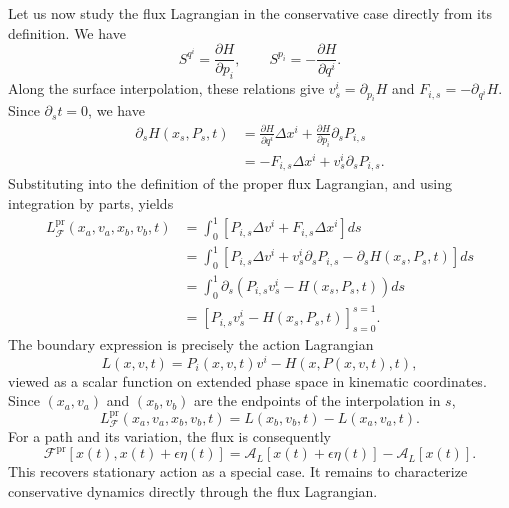 \documentclass[nofootinbib,aps,pre]{revtex4-2}
\begin{document}
Let us now study the flux Lagrangian in the conservative case directly from its definition. We have
\begin{equation}
	S^{q^i}=\frac{\partial H}{\partial p_i},
	\qquad
	S^{p_i}=-\frac{\partial H}{\partial q^i}.
\end{equation}
Along the surface interpolation, these relations give
$v_s^i=\partial_{p_i}H$ and $F_{i,s}=-\partial_{q^i}H$.
Since $\partial_s t=0$, we have
\begin{equation}
	\begin{aligned}
		\partial_s H(x_s,P_s,t)
		&=
		\frac{\partial H}{\partial q^i}\Delta x^i
		+
		\frac{\partial H}{\partial p_i}\partial_sP_{i,s}\\
		&=
		-F_{i,s}\Delta x^i
		+v_s^i\partial_sP_{i,s}.
	\end{aligned}
\end{equation}
Substituting into the definition of the proper flux Lagrangian, and using integration by parts, yields
\begin{equation}
	\begin{aligned}
		L_{\mathcal{F}}^{\mathrm{pr}}(x_a,v_a,x_b,v_b,t)
		&=
		\int_0^1
		\left[
		P_{i,s}\Delta v^i+F_{i,s}\Delta x^i
		\right]ds\\
		&=
		\int_0^1
		\left[
		P_{i,s}\Delta v^i
		+v_s^i\partial_sP_{i,s}
		-\partial_s H(x_s,P_s,t)
		\right]ds\\
		&=
		\int_0^1
		\partial_s\left(P_{i,s}v_s^i-H(x_s,P_s,t)\right)ds\\
		&=
		\left[P_{i,s}v_s^i-H(x_s,P_s,t)\right]_{s=0}^{s=1}.
	\end{aligned}
\end{equation}
The boundary expression is precisely the action Lagrangian
\begin{equation}
	L(x,v,t)
	=
	P_i(x,v,t)v^i-H(x,P(x,v,t),t),
\end{equation}
viewed as a scalar function on extended phase space in kinematic coordinates. Since $(x_a,v_a)$ and $(x_b,v_b)$ are the endpoints of the interpolation in $s$, 
\begin{equation}\label{eq:fluxLagrangianDifference}
	L_{\mathcal{F}}^{\mathrm{pr}}(x_a,v_a,x_b,v_b,t)
	=
	L(x_b,v_b,t)-L(x_a,v_a,t).
\end{equation}
For a path and its variation, the flux is consequently
\begin{equation}
	\mathcal{F}^{\mathrm{pr}}[x(t),x(t)+\epsilon\eta(t)]
	=
	\mathcal{A}_L[x(t)+\epsilon\eta(t)]-\mathcal{A}_L[x(t)].
\end{equation}
This recovers stationary action as a special case. It remains to characterize conservative dynamics directly through the flux Lagrangian.
\end{document}
